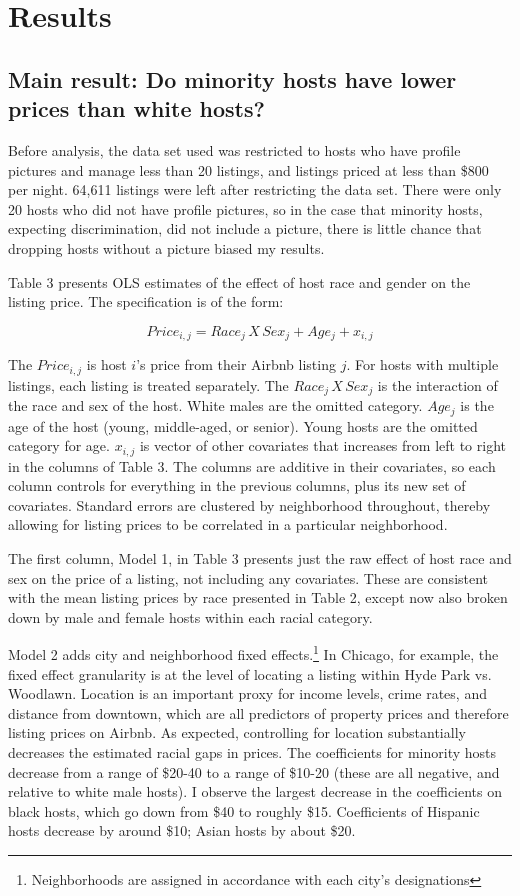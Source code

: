 \documentclass[11pt, oneside]{article}
\begin{document}
\section{Results}
\subsection{Main result: Do minority hosts have lower prices than white hosts?} %

Before analysis, the data set used was restricted to hosts who have profile pictures and manage less than 20 listings, and listings priced at less than \$800 per night. 64,611 listings were left after restricting the data set. There were only 20 hosts who did not have profile pictures, so in the case that minority hosts, expecting discrimination, did not include a picture, there is little chance that dropping hosts without a picture biased my results. 

Table 3 presents OLS estimates of the effect of host race and gender on the listing price. The specification is of the form: 

\[ Price_{i,j} = Race_{j}\,X \,Sex_j + Age_j + x_{i,j}\]

The $Price_{i,j}$ is host $i$'s price from their Airbnb listing $j$. For hosts with multiple listings, each listing is treated separately. The $Race_{j}\,X \,Sex_j$ is the interaction of the race and sex of the host. White males are the omitted category. $Age_j$ is the age of the host (young, middle-aged, or senior). Young hosts are the omitted category for age. $x_{i,j}$ is vector of other covariates that increases from left to right in the columns of Table 3. The columns are additive in their covariates, so each column controls for everything in the previous columns, plus its new set of covariates. Standard errors are clustered by neighborhood throughout, thereby allowing for listing prices to be correlated in a particular neighborhood.

The first column, Model 1, in Table 3 presents just the raw effect of host race and sex on the price of a listing, not including any covariates. These are consistent with the mean listing prices by race presented in Table 2, except now also broken down by male and female hosts within each racial category.

Model 2 adds city and neighborhood fixed effects.\footnote{Neighborhoods are assigned in accordance with each city's designations} In Chicago, for example, the fixed effect granularity is at the level of locating a listing within Hyde Park vs. Woodlawn. Location is an important proxy for income levels, crime rates, and distance from downtown, which are all predictors of property prices and therefore listing prices on Airbnb. As expected, controlling for location substantially decreases the estimated racial gaps in prices. The coefficients for minority hosts decrease from a range of \$20-40 to a range of \$10-20 (these are all negative, and relative to white male hosts). I observe the largest decrease in the coefficients on black hosts, which go down from \$40 to roughly \$15. Coefficients of Hispanic hosts decrease by around \$10; Asian hosts by about \$20. 
\end{document}

